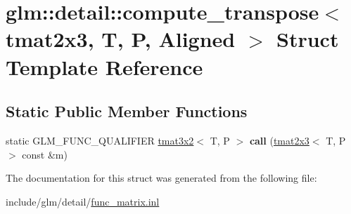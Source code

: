 \hypertarget{structglm_1_1detail_1_1compute__transpose_3_01tmat2x3_00_01T_00_01P_00_01Aligned_01_4}{}\section{glm\+:\+:detail\+:\+:compute\+\_\+transpose$<$ tmat2x3, T, P, Aligned $>$ Struct Template Reference}
\label{structglm_1_1detail_1_1compute__transpose_3_01tmat2x3_00_01T_00_01P_00_01Aligned_01_4}
\subsection*{Static Public Member Functions}
\begin{DoxyCompactItemize}
\item 
\mbox{\label{structglm_1_1detail_1_1compute__transpose_3_01tmat2x3_00_01T_00_01P_00_01Aligned_01_4_af133a98bdc0c3968b2a3f0119388ff9e}} 
static G\+L\+M\+\_\+\+F\+U\+N\+C\+\_\+\+Q\+U\+A\+L\+I\+F\+I\+ER \hyperlink{structglm_1_1tmat3x2}{tmat3x2}$<$ T, P $>$ {\bfseries call} (\hyperlink{structglm_1_1tmat2x3}{tmat2x3}$<$ T, P $>$ const \&m)
\end{DoxyCompactItemize}


The documentation for this struct was generated from the following file\+:\begin{DoxyCompactItemize}
\item 
include/glm/detail/\hyperlink{func__matrix_8inl}{func\+\_\+matrix.\+inl}\end{DoxyCompactItemize}
